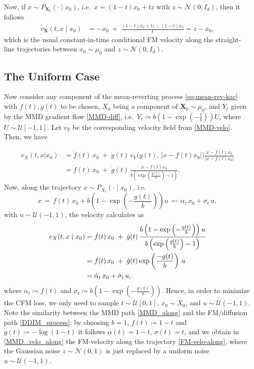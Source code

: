 \documentclass{article}
\theoremstyle{plain}
\theoremstyle{definition}
\theoremstyle{remark}
\begin{document}
Now, if $x \sim P_{\mathbf{X}_t}(\cdot \mid x_0)$, i.e.\ $x = (1-t)x_0 + t z$ with $z \sim \mathcal{N}(0, I_d)$, then it follows
\begin{align}\label{FM-velo-along}
  v_{\mathbf{X}}(t,x\mid x_0)
  &= -x_0 \;+\; \frac{(1-t)x_0 + t z - (1-t)x_0}{t} 
  = z - x_0,
\end{align}
which is the usual constant-in-time conditional FM velocity along the straight-line trajectories between $x_0 \sim \mu_0$ and $z \sim \mathcal{N}(0, I_d)$.

\subsection{The Uniform Case}
Now consider any component of the mean-reverting process \eqref{eq:mean-rev-kac} with $f(t), g(t)$ to be chosen, $X_0$ being a component of $\mathbf{X}_0 \sim \mu_0$, and $Y_t$ given by the MMD gradient flow \eqref{MMD-diff}, i.e.\ $Y_t \coloneqq b \left(1- \exp\left(-\frac{ t}{b} \right)\right) U$, where $U \sim \mathcal{U}[-1,1]$. Let $v_{Y}$ be the corresponding velocity field from \eqref{MMD-velo}. Then, we have

\begin{align}
  v_X(t,x|x_0) &=  \dot f(t)\,x_0 \;+\; \dot g(t)\,v_Y\bigl(g(t),\, |x - f(t)x_0 |\bigr) \frac{x - f(t)x_0}{|x - f(t)x_0|} \\
  &= \dot f(t)\,x_0 \;+\; \dot g(t)\, \frac{x - f(t)x_0}{b \left( \exp\left(\frac{g(t)}{b}\right) - 1\right)}.
\end{align}
Now, along the trajectory $x \sim P_{X_t}(\cdot \mid x_0)$, i.e.\ 
\begin{equation}\label{MMD_along}
    x \,=\, f(t) \,x_0 + b \left(1- \exp\left(-\frac{g(t)}{b} \right)\right) u \,\eqqcolon\, \alpha_t \, x_0 + \sigma_t \, u,
\end{equation}
with $u \sim \mathcal{U}(-1,1)$,
the velocity calculates as
\begin{align}\label{MMD_velo_along}
    v_X(t, x \mid x_0) &= \dot f(t)\,x_0 \;+\; \dot g(t)\, \frac{b \left(1- \exp\left(-\frac{g(t)}{b} \right)\right) u}{b \left( \exp\left(\frac{g(t)}{b}\right) - 1\right)} \notag\\
    &= \dot f(t)\,x_0 \;+\; \dot g(t) \exp\left(\frac{-g(t)}{b}\right) \, u \notag\\
    &= \dot \alpha_t \, x_0 + \dot \sigma_t \, u,
\end{align}
where $\alpha_t \coloneqq f(t)$ and $\sigma_t \coloneqq  b \left(1- \exp\left(-\frac{g(t)}{b} \right)\right)$.
Hence, in order to minimize the CFM loss, we only need to sample $t \sim \mathcal{U}[0,1]$, $x_0 \sim X_0$, and $u \sim \mathcal{U}(-1,1)$. 
Note the similarity between the MMD path \eqref{MMD_along} and the FM/diffusion path \eqref{DDIM_process};
by choosing $b=1$, $f(t) \coloneqq 1-t$ and $g(t) \coloneqq -\log(1-t)$ it follows $\alpha(t) = 1-t$, $\sigma(t) = t$, and we obtain in \eqref{MMD_velo_along}
the FM-velocity along the trajectory \eqref{FM-velo-along}, where the Gaussian noise 
$z \sim \mathcal{N}(0,1)$ is just replaced by a uniform noise $u \sim \mathcal{U}(-1,1)$.
\end{document}

